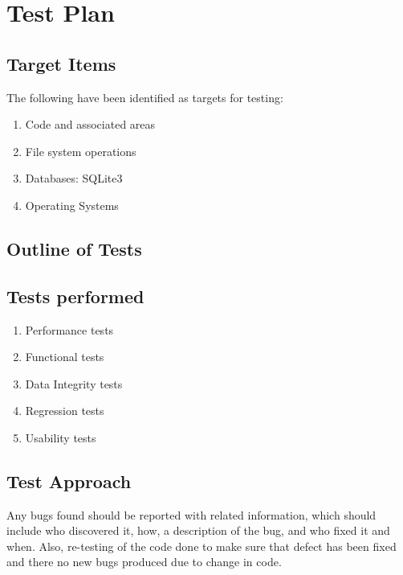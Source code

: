 \section{Test Plan}
\subsection{Target Items}
The following have been identified as targets for testing:
\begin{enumerate}
\item Code and associated areas
\item File system operations
\item Databases: SQLite3
\item Operating Systems
\end{enumerate}

\subsection{Outline of Tests}
\subsection*{Tests performed}
\begin{enumerate}
\item Performance tests
\item Functional tests
\item Data Integrity tests
\item Regression tests
\item Usability tests
\end{enumerate}

\subsection{Test Approach}
Any bugs found should be reported with related information, which should include
who discovered it, how, a description of the bug, and who fixed it and
when. Also, re-testing of the code done to make sure that defect has been fixed
and there no new bugs produced due to change in code.

